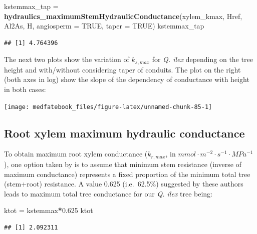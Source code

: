\documentclass[]{book}
\newenvironment{Shaded}{\begin{snugshade}}{\end{snugshade}}
\newcommand{\KeywordTok}[1]{\textcolor[rgb]{0.13,0.29,0.53}{\textbf{#1}}}
\newcommand{\DataTypeTok}[1]{\textcolor[rgb]{0.13,0.29,0.53}{#1}}
\newcommand{\FloatTok}[1]{\textcolor[rgb]{0.00,0.00,0.81}{#1}}
\newcommand{\StringTok}[1]{\textcolor[rgb]{0.31,0.60,0.02}{#1}}
\newcommand{\OtherTok}[1]{\textcolor[rgb]{0.56,0.35,0.01}{#1}}
\newcommand{\OperatorTok}[1]{\textcolor[rgb]{0.81,0.36,0.00}{\textbf{#1}}}
\newcommand{\NormalTok}[1]{#1}
\begin{document}
\begin{Shaded}
\begin{Highlighting}[]
\NormalTok{kstemmax_tap =}\StringTok{ }\KeywordTok{hydraulics_maximumStemHydraulicConductance}\NormalTok{(xylem_kmax, }
\NormalTok{                      Href, Al2As, H, }\DataTypeTok{angiosperm =} \OtherTok{TRUE}\NormalTok{, }\DataTypeTok{taper =} \OtherTok{TRUE}\NormalTok{)}
\NormalTok{kstemmax_tap}
\end{Highlighting}
\end{Shaded}

\begin{verbatim}
## [1] 4.764396
\end{verbatim}

The next two plots show the variation of \(k_{s,max}\) for \emph{Q. ilex} depending on the tree height and with/without considering taper of conduits. The plot on the right (both axes in log) show the slope of the dependency of conductance with height in both cases:

\begin{center}\texttt{[image: medfatebook\_files/figure-latex/unnamed-chunk-85-1]} \end{center}

\hypertarget{root-xylem-maximum-hydraulic-conductance}{%
\subsection{Root xylem maximum hydraulic conductance}\label{root-xylem-maximum-hydraulic-conductance}}

To obtain maximum root xylem conductance (\(k_{r, max}\), in \(mmol \cdot m^{-2} \cdot s^{-1} \cdot MPa^{-1}\)), one option taken by \citet{Christoffersen2016} is to assume that minimum stem resistance (inverse of maximum conductance) represents a fixed proportion of the minimum total tree (stem+root) resistance. A value 0.625 (i.e.~62.5\%) suggested by these authors leads to maximum total tree conductance for our \emph{Q. ilex} tree being:

\begin{Shaded}
\begin{Highlighting}[]
\NormalTok{ktot =}\StringTok{ }\NormalTok{kstemmax}\OperatorTok{*}\FloatTok{0.625}
\NormalTok{ktot}
\end{Highlighting}
\end{Shaded}

\begin{verbatim}
## [1] 2.092311
\end{verbatim}
\end{document}
